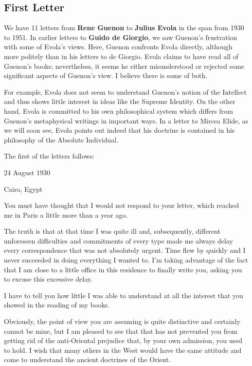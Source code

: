 \subsection{First Letter}

\begin{quotex}
We have 11 letters from \textbf{Rene Guenon} to \textbf{Julius Evola} in the span from 1930 to 1951. In earlier letters to \textbf{Guido de Giorgio}, we saw Guenon's frustration with some of Evola's views. Here, Guenon confronts Evola directly, although more politely than in his letters to de Giorgio. Evola claims to have read all of Guenon's books; nevertheless, it seems he either misunderstood or rejected some significant aspects of Guenon's view. I believe there is some of both.

For example, Evola does not seem to understand Guenon's notion of the Intellect and thus shows little interest in ideas like the Supreme Identity. On the other hand, Evola is committed to his own philosophical system which differs from Guenon's metaphysical writings in important ways. In a letter to Mircea Elide, as we will soon see, Evola points out indeed that his doctrine is contained in his philosophy of the Absolute Individual.

The first of the letters follows:

\end{quotex}
24 August 1930

Cairo, Egypt

You must have thought that I would not respond to your letter, which reached me in Paris a little more than a year ago.

The truth is that at that time I was quite ill and, subsequently, different unforeseen difficulties and commitments of every type made me always delay every correspondence that was not absolutely urgent. Time flew by quickly and I never succeeded in doing everything I wanted to. I'm taking advantage of the fact that I am close to a little office in this residence to finally write you, asking you to excuse this excessive delay.

I have to tell you how little I was able to understand at all the interest that you showed in the reading of my books.

Obviously, the point of view you are assuming is quite distinctive and certainly cannot be mine, but I am pleased to see that that has not prevented you from getting rid of the anti-Oriental prejudice that, by your own admission, you used to hold. I wish that many others in the West would have the same attitude and come to understand the ancient doctrines of the Orient.

